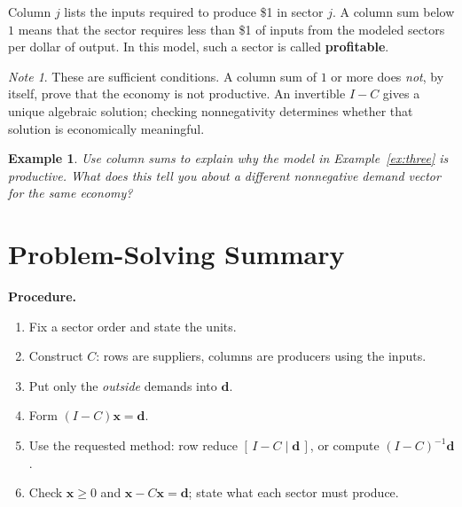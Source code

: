 \documentclass{article}
\theoremstyle{plain}
\newtheorem{example}{Example}[section]
\theoremstyle{definition}
\theoremstyle{remark}
\newtheorem*{note}{Note}
\renewcommand{\vec}[1]{\mathbf{#1}}
\newcommand{\work}{\par\vfill}
\begin{document}
Column $j$ lists the inputs required to produce \$1 in sector $j$. A column sum below $1$ means that the sector requires less than \$1 of inputs from the modeled sectors per dollar of output. In this model, such a sector is called \textbf{profitable}.

\begin{note}
These are sufficient conditions. A column sum of $1$ or more does \emph{not}, by itself, prove that the economy is not productive. An invertible $I-C$ gives a unique algebraic solution; checking nonnegativity determines whether that solution is economically meaningful.
\end{note}

\begin{example}
Use column sums to explain why the model in Example~\ref{ex:three} is productive. What does this tell you about a different nonnegative demand vector for the same economy?
\end{example}
\work

\newpage
\section*{Problem-Solving Summary}
\textbf{Procedure.}
\begin{enumerate}
\item Fix a sector order and state the units.
\item Construct $C$: rows are suppliers, columns are producers using the inputs.
\item Put only the \emph{outside} demands into $\vec{d}$.
\item Form $(I-C)\vec{x}=\vec{d}$.
\item Use the requested method: row reduce $[\,I-C\mid\vec{d}\,]$, or compute $(I-C)^{-1}\vec{d}$.
\item Check $\vec{x}\ge0$ and $\vec{x}-C\vec{x}=\vec{d}$; state what each sector must produce.
\end{enumerate}
\end{document}
